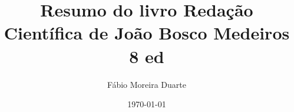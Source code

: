 \documentclass{report}
\title{Resumo do livro Redação Científica de João Bosco Medeiros 8 ed}
\author{Fábio Moreira Duarte}
\date{\today}
\begin{document}
\maketitle
\tableofcontents{}









\end{document}
